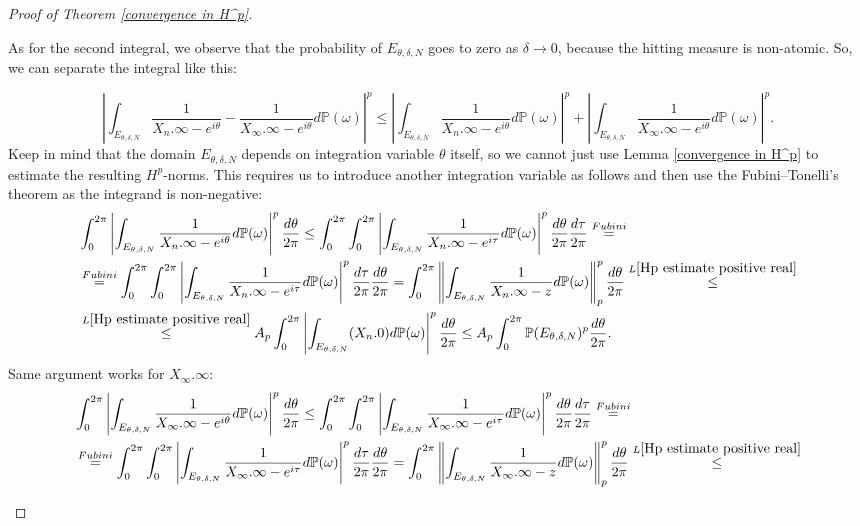 \documentclass[11pt]{article}
\begin{document}
\begin{proof}[Proof of Theorem \ref{convergence in H^p}]
\begin{itemize}
		As for the second integral, we observe that the probability of $E_{\theta, \delta, N}$ goes to zero as $\delta \rightarrow 0$, because the hitting measure is non-atomic. So, we can separate the integral like this:
		
		\[
		\left| \int_{E_{\theta, \delta, N}} \frac{1}{X_n.\infty - e^{i \theta}} - \frac{1}{X_\infty.\infty - e^{i \theta}} d \mathbb{P}(\omega) \right|^p \le \left| \int_{E_{\theta, \delta, N}} \frac{1}{X_n.\infty - e^{i \theta}} d \mathbb{P}(\omega) \right|^p + \left| \int_{E_{\theta, \delta, N}} \frac{1}{X_\infty.\infty - e^{i \theta}} d \mathbb{P}(\omega) \right|^p .
		\]
		Keep in mind that the domain $E_{\theta, \delta, N}$ depends on integration variable $\theta$ itself, so we cannot just use Lemma \ref{convergence in H^p} to estimate the resulting $H^p$-norms. This requires us to introduce another integration variable as follows and then use the Fubini–Tonelli's theorem as the integrand is non-negative:
		\[
		\begin{aligned}
			& \int_{0}^{2\pi} \left| \int_{E_{\theta, \delta, N}} \frac{1}{X_n.\infty - e^{i \theta}} d \mathbb{P}(\omega) \right|^p \frac{d \theta}{2 \pi} \le  \int_{0}^{2 \pi} \int_{0}^{2\pi} \left| \int_{E_{\theta, \delta, N}} \frac{1}{X_n.\infty - e^{i \tau}} d \mathbb{P}(\omega) \right|^p \frac{d \theta}{2 \pi} \frac{d \tau}{2 \pi} \stackrel{Fubini}{=} \\ & \stackrel{Fubini}{=} \int_{0}^{2 \pi} \int_{0}^{2\pi} \left| \int_{E_{\theta, \delta, N}} \frac{1}{X_n.\infty - e^{i \tau}} d \mathbb{P}(\omega) \right|^p \frac{d \tau}{2 \pi} \frac{d \theta}{2 \pi} = \int_{0}^{2 \pi} \left\| \int_{E_{\theta, \delta, N}} \frac{1}{X_n.\infty - z} d \mathbb{P}(\omega) \right\|_p^p  \frac{d \theta}{2 \pi} \stackrel{L \ref{Hp estimate positive real}}{\le} \\ 
			& \stackrel{L \ref{Hp estimate positive real}}{\le} A_p \int_{0}^{2 \pi} \left| \int_{E_{\theta, \delta, N}} (X_n.0) d \mathbb{P}(\omega) \right|^p \frac{d\theta}{2 \pi} \le A_p \int_{0}^{2 \pi} \mathbb{P}( E_{\theta, \delta, N})^p \frac{d \theta}{2 \pi}.
		\end{aligned}
		\]
		Same argument works for $X_{\infty}.\infty$:
		\[
		\begin{aligned}
			& \int_{0}^{2\pi} \left| \int_{E_{\theta, \delta, N}} \frac{1}{X_{\infty}.\infty - e^{i \theta}} d \mathbb{P}(\omega) \right|^p \frac{d \theta}{2 \pi} \le  \int_{0}^{2 \pi} \int_{0}^{2\pi} \left| \int_{E_{\theta, \delta, N}} \frac{1}{X_{\infty}.\infty - e^{i \tau}} d \mathbb{P}(\omega) \right|^p \frac{d \theta}{2 \pi} \frac{d \tau}{2 \pi} \stackrel{Fubini}{=} \\ & \stackrel{Fubini}{=} \int_{0}^{2 \pi} \int_{0}^{2\pi} \left| \int_{E_{\theta, \delta, N}} \frac{1}{X_{\infty}.\infty - e^{i \tau}} d \mathbb{P}(\omega) \right|^p \frac{d \tau}{2 \pi} \frac{d \theta}{2 \pi} = \int_{0}^{2 \pi} \left\| \int_{E_{\theta, \delta, N}} \frac{1}{X_{\infty}.\infty - z} d \mathbb{P}(\omega) \right\|_p^p  \frac{d \theta}{2 \pi} \stackrel{L \ref{Hp estimate positive real}}{\le} \\ 

\end{aligned}\]
\end{itemize}
\end{proof}
\end{document}
